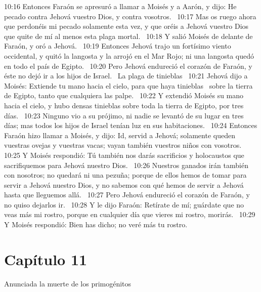 10:16 Entonces Faraón se apresuró a llamar a Moisés y a Aarón, y dijo: He pecado contra Jehová vuestro Dios, y contra vosotros.  
10:17 Mas os ruego ahora que perdonéis mi pecado solamente esta vez, y que oréis a Jehová vuestro Dios que quite de mí al menos esta plaga mortal.  
10:18 Y salió Moisés de delante de Faraón, y oró a Jehová.  
10:19 Entonces Jehová trajo un fortísimo viento occidental, y quitó la langosta y la arrojó en el Mar Rojo; ni una langosta quedó en todo el país de Egipto.  
10:20 Pero Jehová endureció el corazón de Faraón, y éste no dejó ir a los hijos de Israel.  
La plaga de tinieblas  
10:21 Jehová dijo a Moisés: Extiende tu mano hacia el cielo, para que haya tinieblas  sobre la tierra de Egipto, tanto que cualquiera las palpe.  
10:22 Y extendió Moisés su mano hacia el cielo, y hubo densas tinieblas sobre toda la tierra de Egipto, por tres días.  
10:23 Ninguno vio a su prójimo, ni nadie se levantó de su lugar en tres días; mas todos los hijos de Israel tenían luz en sus habitaciones.  
10:24 Entonces Faraón hizo llamar a Moisés, y dijo: Id, servid a Jehová; solamente queden vuestras ovejas y vuestras vacas; vayan también vuestros niños con vosotros. 
10:25 Y Moisés respondió: Tú también nos darás sacrificios y holocaustos que sacrifiquemos para Jehová nuestro Dios.  
10:26 Nuestros ganados irán también con nosotros; no quedará ni una pezuña; porque de ellos hemos de tomar para servir a Jehová nuestro Dios, y no sabemos con qué hemos de servir a Jehová hasta que lleguemos allá.  
10:27 Pero Jehová endureció el corazón de Faraón, y no quiso dejarlos ir.  
10:28 Y le dijo Faraón: Retírate de mí; guárdate que no veas más mi rostro, porque en cualquier día que vieres mi rostro, morirás.  
10:29 Y Moisés respondió: Bien has dicho; no veré más tu rostro.  
\section*{Capítulo 11}
Anunciada la muerte de los primogénitos 

